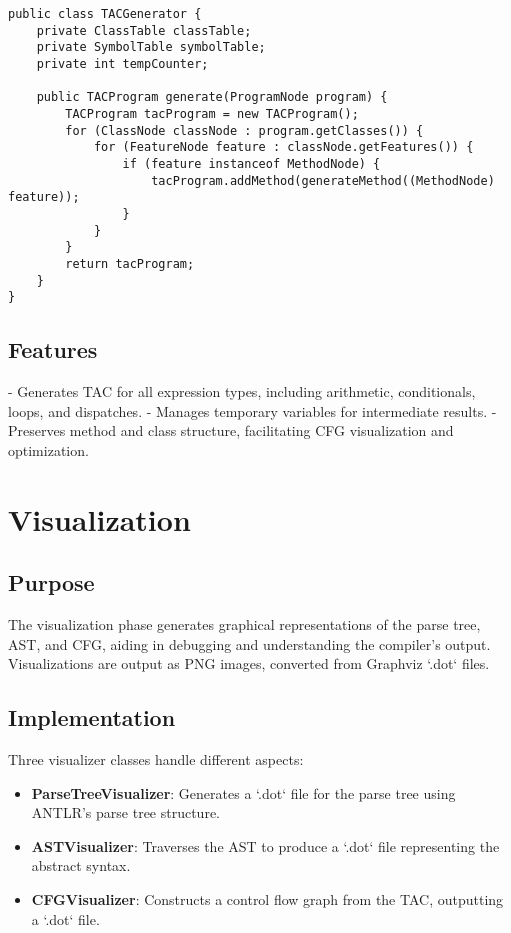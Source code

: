 \documentclass[titlepage]{article}
\begin{document}
\begin{lstlisting}
public class TACGenerator {
    private ClassTable classTable;
    private SymbolTable symbolTable;
    private int tempCounter;

    public TACProgram generate(ProgramNode program) {
        TACProgram tacProgram = new TACProgram();
        for (ClassNode classNode : program.getClasses()) {
            for (FeatureNode feature : classNode.getFeatures()) {
                if (feature instanceof MethodNode) {
                    tacProgram.addMethod(generateMethod((MethodNode) feature));
                }
            }
        }
        return tacProgram;
    }
}
\end{lstlisting}

\subsection{Features}

- Generates TAC for all expression types, including arithmetic, conditionals, loops, and dispatches.
- Manages temporary variables for intermediate results.
- Preserves method and class structure, facilitating CFG visualization and optimization.

\section{Visualization}

\subsection{Purpose}

The visualization phase generates graphical representations of the parse tree, AST, and CFG, aiding in debugging and understanding the compiler's output. Visualizations are output as PNG images, converted from Graphviz `.dot` files.

\subsection{Implementation}

Three visualizer classes handle different aspects:

\begin{itemize}
    \item \textbf{ParseTreeVisualizer}: Generates a `.dot` file for the parse tree using ANTLR's parse tree structure.
    \item \textbf{ASTVisualizer}: Traverses the AST to produce a `.dot` file representing the abstract syntax.
    \item \textbf{CFGVisualizer}: Constructs a control flow graph from the TAC, outputting a `.dot` file.
\end{itemize}
\end{document}
